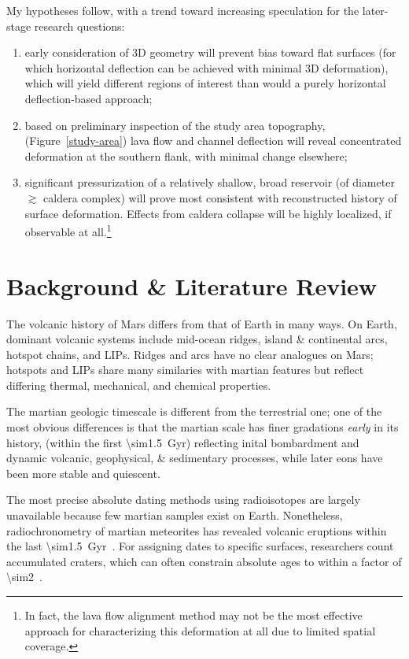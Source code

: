 My hypotheses follow, with a trend toward increasing speculation for the later-stage research questions:\begin{enumerate}
    \item early consideration of 3D geometry will prevent bias toward flat surfaces (for which horizontal deflection can be achieved with minimal 3D deformation), which will yield different regions of interest than would a purely horizontal deflection-based approach;
    \item based on preliminary inspection of the study area topography, (Figure~\ref{study-area}) lava flow and channel deflection will reveal concentrated deformation at the southern flank, with minimal change elsewhere;
    \item significant pressurization of a relatively shallow, broad reservoir (of diameter $\gtrsim$ caldera complex) will prove most consistent with reconstructed history of surface deformation. Effects from caldera collapse will be highly localized, if observable at all.\footnote{In fact, the lava flow alignment method may not be the most effective approach for characterizing this deformation at all due to limited spatial coverage.}
\end{enumerate}

\section{Background \& Literature Review}

The volcanic history of Mars differs from that of Earth in many ways. On Earth, dominant volcanic systems include mid-ocean ridges, island \& continental arcs, hotspot chains, and \acp{LIP}. Ridges and arcs have no clear analogues on Mars; hotspots and \acp{LIP} share many similaries with martian features but reflect differing thermal, mechanical, and chemical properties.

The martian geologic timescale is different from the terrestrial one; one of the most obvious differences is that the martian scale has finer gradations \textit{early} in its history, (within the first \qty{\sim1.5}{Gyr}) reflecting inital bombardment and dynamic volcanic, geophysical, \& sedimentary processes, while later eons have been more stable and quiescent.

The most precise absolute dating methods using radioisotopes are largely unavailable because few martian samples exist on Earth. Nonetheless, radiochronometry of martian meteorites has revealed volcanic eruptions within the last \qty{\sim1.5}{Gyr}~\parencite[e.g.,][]{cohen_taking_2017}. For assigning dates to specific surfaces, researchers count accumulated craters, which can often constrain absolute ages to within a factor of \num{\sim2}~\parencite{kneissl_map-projection-independent_2011}.

